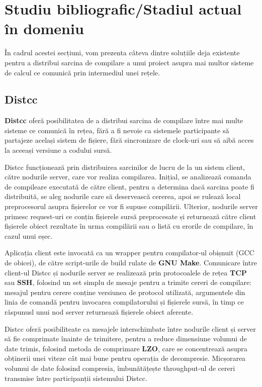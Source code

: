 \chapter{Studiu bibliografic/Stadiul actual în domeniu}

În cadrul acestei secțiuni, vom prezenta câteva dintre soluțiile deja existente pentru a 
distribui sarcina de compilare a unui proiect asupra mai multor sisteme de calcul ce comunică
prin intermediul unei rețele.

\section{Distcc}

\textbf{Distcc}\cite{pool2003distcc} oferă posibilitatea de a distribui sarcina de compilare între
mai multe sisteme ce comunică în rețea, fără a fi nevoie ca sistemele participante să partajeze 
același sistem de fișiere, fără sincronizare de clock-uri sau să aibă acces la aceeași versiune a
codului sursă. 

Distcc funcționează prin distribuirea sarcinilor de lucru de la un sistem client, către nodurile
server, care vor realiza compilarea. Inițial, se analizează comanda de compileare executată de
către client, pentru a determina dacă sarcina poate fi distribuită, se aleg nodurile care să
deservească cererea, apoi se rulează local preprocesorul asupra fișierelor ce vor fi supuse
compilării. Ulterior, nodurile server primesc request-uri ce conțin fișierele sursă preprocesate și
returnează către client fișierele obiect rezultate în urma compilării sau o listă cu erorile de 
compilare, în cazul unui eșec.

Aplicația client este invocată ca un wrapper pentru compilator-ul obișnuit (GCC de obicei), de către
script-urile de build rulate de \textbf{GNU Make}. Comunicare între client-ul Distcc și nodurile
server se realizează prin protocoalele de rețea \textbf{TCP} sau \textbf{SSH}, folosind un set
simplu de mesaje pentru a trimite cereri de compilare: mesajul pentru cerere conține versiunea de
protocol utilizată, argumentele din linia de comandă pentru invocarea compilatorului și fișierele
sursă, în timp ce răspunusl unui nod server returnează fișierele obiect aferente.

Distcc oferă posibiliteate ca mesajele interschimbate între nodurile client și server să fie
comprimate înainte de trimitere, pentru a reduce dimensiune volumui de date trimis, folosind
metoda de comprimare \textbf{LZO}\cite{tarreau2018lzo}, care se concentrează asupra obținerii unei 
viteze cât mai bune pentru operația de decompresie. Micșorarea volumui de date folosind compresia,
îmbunătățește throughput-ul de cereri transmise între participanții sistemului Distcc.

